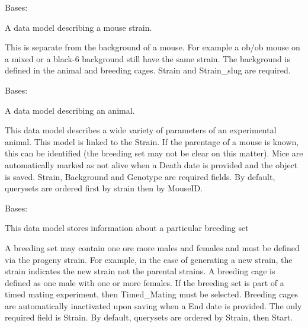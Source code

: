 \documentclass[letterpaper,10pt,english]{sphinxmanual}
\begin{document}

\begin{fulllineitems}
\label{api:animal.models.Strain}
Bases: 

A data model describing a mouse strain.

This is separate from the background of a mouse.  For example a ob/ob mouse on a mixed or a black-6 background still have the same strain.  The background is defined in the animal and breeding cages.  Strain and Strain\_slug are required.

\end{fulllineitems}



\begin{fulllineitems}
\label{api:animal.models.Animal}
Bases: 

A data model describing an animal.

This data model describes a wide variety of parameters of an experimental animal.  This model is linked to the Strain.  If the parentage of a mouse is known, this can be identified (the breeding set may not be clear on this matter). Mice are automatically marked as not alive when a Death date is provided and the object is saved.  Strain, Background and Genotype are required fields.  By default, querysets are ordered first by strain then by MouseID.

\end{fulllineitems}



\begin{fulllineitems}
\label{api:animal.models.Breeding}
Bases: 

This data model stores information about a particular breeding set

A breeding set may contain one ore more males and females and must be defined via the progeny strain.  For example, in the case of generating a new strain, the strain indicates the new strain not the parental strains.  A breeding cage is defined as one male with one or more females.  If the breeding set is part of a timed mating experiment, then Timed\_Mating must be selected.  Breeding cages are automatically inactivated upon saving when a End date is provided.  The only required field is Strain.  By default, querysets are ordered by Strain, then Start.

\end{fulllineitems}
\end{document}
